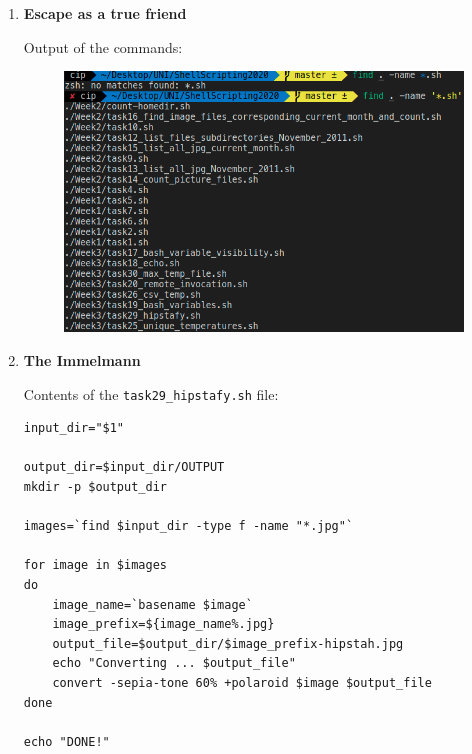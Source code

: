 \documentclass[9pt]{article}
\begin{document}
\begin{enumerate}
    \item \textbf{Escape as a true friend}
    
        Output of the commands:
        \begin{figure}[h!]
            \centering
            \includegraphics[width=\linewidth-2cm]{img/28.png}
        \end{figure}

    \item \textbf{The Immelmann}
    
        Contents of the \texttt{task29\_hipstafy.sh} file:
        \begin{lstlisting}[breaklines=true]
input_dir="$1"

output_dir=$input_dir/OUTPUT
mkdir -p $output_dir

images=`find $input_dir -type f -name "*.jpg"`

for image in $images
do
    image_name=`basename $image`
    image_prefix=${image_name%.jpg}
    output_file=$output_dir/$image_prefix-hipstah.jpg
    echo "Converting ... $output_file" 
    convert -sepia-tone 60% +polaroid $image $output_file 
done

echo "DONE!"
        \end{lstlisting}    


\end{enumerate}
\end{document}
